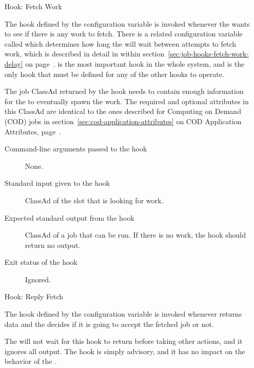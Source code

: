 \begin{itemize}
\item[Hook: Fetch Work]

The hook defined by the configuration variable
 is invoked whenever the 
wants to see if there is any work to fetch.
There is a related configuration variable called
 which determines how long the 
will wait between attempts to fetch work, which is described in detail
in within section~\ref{sec:job-hooks-fetch-work-delay} on
page~\pageref{sec:job-hooks-fetch-work-delay}.
 is the most important hook in the whole
system, and is the only hook that must be defined for any of the other
 hooks to operate.

The job ClassAd returned by the hook needs to contain enough
information for the  to eventually spawn the work.
The required and optional attributes in this ClassAd are identical to
the ones described for Computing on Demand (COD) jobs in
section~\ref{sec:cod-application-attributes} 
on COD Application Attributes, 
page~\pageref{sec:cod-application-attributes}.

\begin{description}
\item[Command-line arguments passed to the hook]
  None.

\item[Standard input given to the hook]
  ClassAd of the slot that is looking for work.

\item[Expected standard output from the hook]
  ClassAd of a job that can be run.
  If there is no work, the hook should return no output.

\item[Exit status of the hook]
  Ignored.
\end{description}


\item[Hook: Reply Fetch]

The hook defined by the configuration variable
 is invoked whenever
 returns data and the 
decides if it is going to accept the fetched job or not.

The  will not wait for this hook to return before
taking other actions, and it ignores all output.
The hook is simply advisory, and it has no impact on the behavior of the
.


\end{itemize}
